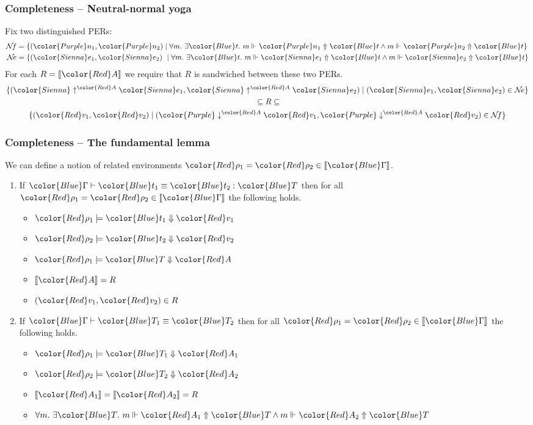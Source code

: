 \documentclass[svgnames]{beamer}
\newcommand\fmttm[1]{{\color{Blue}#1}}
\newcommand\fmtval[1]{{\color{Red}#1}}
\newcommand\fmtne[1]{{\color{Sienna}#1}}
\newcommand\fmtnf[1]{{\color{Purple}#1}}
\newcommand{\sem}[1]{\llbracket #1 \rrbracket}
\newcommand{\vup}[2]{{\fmtne{\uparrow^{\fmtval{#1}} \fmtne{#2}}}}
\newcommand{\vnf}[2]{{\fmtnf{\downarrow^{\fmtval{#1}} \fmtval{#2}}}}
\newcommand{\eqterm}[4]{\fmttm{#1} \vdash \fmttm{#2} \equiv \fmttm{#3} : \fmttm{#4}}
\newcommand{\eqtype}[3]{\fmttm{#1}\vdash\fmttm{#2} \equiv \fmttm{#3}}
\newcommand{\Nf}{\mathcal{N}\!f}
\newcommand{\Ne}{\mathcal{N}\!e}
\newcommand{\gpheval}[3]{\fmtval{#1}\models\fmttm{#2}\Downarrow\fmtval{#3}}
\newcommand{\gphquone}[3]{#1\Vdash\fmtne{#2}\Uparrow\fmttm{#3}}
\newcommand{\gphquotp}[3]{#1\Vdash\fmtval{#2}\Uparrow\fmttm{#3}}
\newcommand{\gphquonf}[3]{#1\Vdash\fmtnf{#2}\Uparrow\fmttm{#3}}
\begin{document}
\begin{frame}
  \frametitle{Completeness -- Neutral-normal yoga}
  Fix two distinguished PERs:
  \begin{align*}
    \Nf &= \{(\fmtnf{n_1}, \fmtnf{n_2}) \mid \forall m.\ \exists \fmttm{t}.\ \gphquonf{m}{n_1}{t} \land \gphquonf{m}{n_2}{t}\}\\
    \Ne &= \{(\fmtne{e_1}, \fmtne{e_2})\ \mid \forall m.\ \exists \fmttm{t}.\ \gphquone{m}{e_1}{t} \land \gphquone{m}{e_2}{t}\}\\
  \end{align*}
  For each $R = \sem{\fmtval{A}}$ we require that $R$ is sandwiched between these two PERs.
  \begin{gather*}
    \{(\vup{A}{e_1}, \vup{A}{e_2}) \mid (\fmtne{e_1}, \fmtne{e_2}) \in \Ne\}\\
    {}\subseteq R \subseteq\\
    \{(\fmtval{v_1}, \fmtval{v_2}) \mid (\vnf{A}{v_1}, \vnf{A}{v_2}) \in \Nf\}
  \end{gather*}
\end{frame}

\begin{frame}
  \frametitle{Completeness -- The fundamental lemma}
  We can define a notion of related environments
  $\fmtval{\rho_1} = \fmtval{\rho_2} \in \sem{\fmttm{\Gamma}}$.

  \begin{enumerate}
  \item If $\eqterm{\Gamma}{t_1}{t_2}{T}$ then for all
    $\fmtval{\rho_1} = \fmtval{\rho_2} \in \sem{\fmttm{\Gamma}}$ the following holds.
    \begin{itemize}
    \item $\gpheval{\rho_1}{t_1}{v_1}$
    \item $\gpheval{\rho_2}{t_2}{v_2}$
    \item $\gpheval{\rho_1}{T}{A}$
    \item $\sem{\fmtval{A}} = R$
    \item $(\fmtval{v_1}, \fmtval{v_2}) \in R$
    \end{itemize}
  \item If $\eqtype{\Gamma}{T_1}{T_2}$ then for all
    $\fmtval{\rho_1} = \fmtval{\rho_2} \in \sem{\fmttm{\Gamma}}$ the following holds.
    \begin{itemize}
    \item $\gpheval{\rho_1}{T_1}{A_1}$
    \item $\gpheval{\rho_2}{T_2}{A_2}$
    \item $\sem{\fmtval{A_1}} = \sem{\fmtval{A_2}} = R$
    \item $\forall m.\ \exists \fmttm{T}.\ \gphquotp{m}{A_1}{T} \land \gphquotp{m}{A_2}{T}$
    \end{itemize}
  \end{enumerate}
\end{frame}
\end{document}
